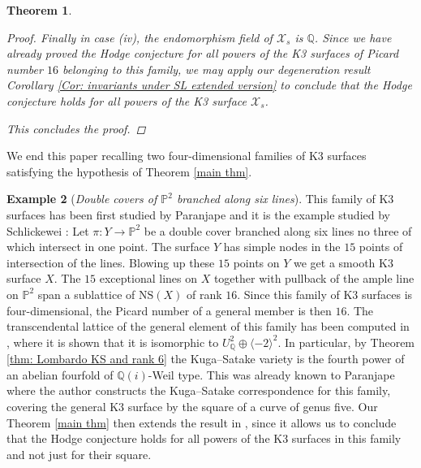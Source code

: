 \documentclass[11pt,twoside,a4paper]{amsart}
\newcommand{\0}{\mathscr{O}}
\newcommand{\p}{\mathbb{P}}
\newcommand{\Q}{\mathbb{Q}}
\newcommand{\X}{\mathscr{X}}
\theoremstyle{plain}
\newtheorem{thm}{Theorem}[section]
\theoremstyle{definition}
\newtheorem{exmp}[thm]{Example}
\theoremstyle{remark}
\begin{document}
\begin{thm}
\begin{proof}
\smallskip

Finally in case (iv), the endomorphism field of $\X_s$ is $\Q$. Since we have already proved the Hodge conjecture for all powers of the K3 surfaces of Picard number $16$ belonging to this family, we may apply our degeneration result Corollary \ref{Cor: invariants under SL extended version} to conclude that the Hodge conjecture holds for all powers of the K3 surface $\X_s$.

\smallskip

This concludes the proof.
\end{proof}
\end{thm}

We end this paper recalling two four-dimensional families of K3 surfaces satisfying the hypothesis of Theorem \ref{main thm}.

\begin{exmp}[\textit{Double covers of $\mathbb{P}^2$ branched along six lines}]
This family of K3 surfaces has been first studied by Paranjape \cite{paranjape} and it is the example studied by Schlickewei \cite{schlickewei2010hodge}: 
Let $\pi\colon Y \rightarrow \p^2$ be a double cover branched along six lines no three of which intersect in one point. The surface $Y$ has simple nodes in the $15$ points of intersection of the lines. Blowing up these $15$ points on $Y$ we get a smooth K3 surface $X$. The $15$ exceptional lines on $X$ together with pullback of the ample line on $\p^2$ span a sublattice of $\mathrm{NS}(X)$ of rank $16$. Since this family of K3 surfaces is four-dimensional, the Picard number of a general member is then $16$. The transcendental lattice of the general element of this family has been computed in \cite[Lem.\ 1]{paranjape}, where it is shown that it is isomorphic to 
$ U_\Q^2\oplus\langle-2\rangle^2$.
In particular, by Theorem \ref{thm: Lombardo KS and rank 6} the Kuga--Satake variety is the fourth power of an abelian fourfold of $\Q(i)$-Weil type.
This was already known to Paranjape \cite{paranjape} where the author constructs the Kuga--Satake correspondence for this family, covering the general K3 surface by the square of a curve of genus five. Our Theorem \ref{main thm} then extends the result in \cite{schlickewei2010hodge}, since it allows us to conclude that the Hodge conjecture holds for all powers of the K3 surfaces in this family and not just for their square.
\end{exmp}
\end{document}
